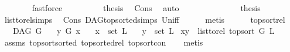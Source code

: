 \begin{isabellebody}
\ \ \ \ \ \ \isamarkupfalse%
\ fastforce\ \ \isanewline
\ \ \ \ \isamarkupfalse%
\ \isamarkupfalse%
\ {\isacharquery}{\kern0pt}thesis\ \isamarkupfalse%
\ Cons\ \isamarkupfalse%
\ auto\isanewline
\ \ \isamarkupfalse%
\isanewline
\ \ \ \ \isamarkupfalse%
\ {}\isanewline
\ \ \isamarkupfalse%
\ \isamarkupfalse%
\ {\isacharquery}{\kern0pt}thesis\ \isamarkupfalse%
\ list{\isacharunderscore}{\kern0pt}to{\isacharunderscore}{\kern0pt}rel{\isachardot}{\kern0pt}simps\ \isamarkupfalse%
\ Cons\ DAG{\isachardot}{\kern0pt}top{\isacharunderscore}{\kern0pt}sorted{\isachardot}{\kern0pt}simps{\isacharparenleft}{\kern0pt}{}{\isacharparenright}{\kern0pt}\ Un{\isacharunderscore}{\kern0pt}iff\isanewline
\ \ \ \ \isamarkupfalse%
\ metis\ \ \isanewline
\ \ \isamarkupfalse%
\isanewline
{}\isamarkupfalse%
%
\endisatagproof
{\isafoldproof}%
%
\isadelimproof
\isanewline
%
\endisadelimproof
\isanewline
{}\isamarkupfalse%
\ top{\isacharunderscore}{\kern0pt}sort{\isacharunderscore}{\kern0pt}rel{\isacharcolon}{\kern0pt}\ \isanewline
\ \ \ {\isachardoublequoteopen}DAG\ G{\isachardoublequoteclose}\isanewline
\ \ \ {\isachardoublequoteopen}y\ {\isasymrightarrow}\isactrlsup {\isacharplus}{\kern0pt}\isactrlbsub G\isactrlesub \ x{\isachardoublequoteclose}\isanewline
\ \ \ {\isachardoublequoteopen}x\ {\isasymin}\ set\ L{\isachardoublequoteclose}\isanewline
\ \ \ {\isachardoublequoteopen}y\ {\isasymin}\ set\ L{\isachardoublequoteclose}\isanewline
{}\ {\isachardoublequoteopen}{\isacharparenleft}{\kern0pt}x{\isacharcomma}{\kern0pt}y{\isacharparenright}{\kern0pt}\ {\isasymin}\ list{\isacharunderscore}{\kern0pt}to{\isacharunderscore}{\kern0pt}rel\ {\isacharparenleft}{\kern0pt}top{\isacharunderscore}{\kern0pt}sort\ G\ L{\isacharparenright}{\kern0pt}{\isachardoublequoteclose}\isanewline
%
\isadelimproof
\ \ %
\endisadelimproof
%
\isatagproof
{}\isamarkupfalse%
\ assms\ top{\isacharunderscore}{\kern0pt}sort{\isacharunderscore}{\kern0pt}sorted\ top{\isacharunderscore}{\kern0pt}sorted{\isacharunderscore}{\kern0pt}rel\ top{\isacharunderscore}{\kern0pt}sort{\isacharunderscore}{\kern0pt}con\isanewline
\ \ \isamarkupfalse%
\ metis%
\endisatagproof
{\isafoldproof}%
%
\isadelimproof
\ \ \isanewline
%
\endisadelimproof
%
\isadelimtheory
\isanewline
%
\endisadelimtheory
%
\isatagtheory
{}\isamarkupfalse%
%
\endisatagtheory
{\isafoldtheory}%
%
\isadelimtheory
%
\endisadelimtheory
%
\end{isabellebody}%
